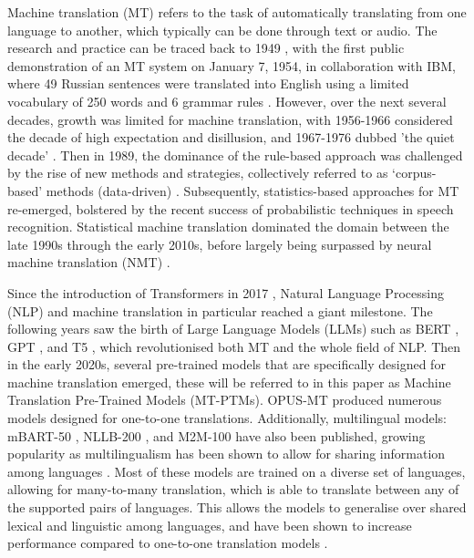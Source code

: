 \documentclass[a4paper, 11pt]{article}
\begin{document}
Machine translation (MT) refers to the task of automatically translating from one language to another, which typically can be done through text or audio. The research and practice can be traced back to 1949 \cite{weaver-1999}, with the first public demonstration of an MT system on January 7, 1954, in collaboration with IBM, where 49 Russian sentences were translated into English using a limited vocabulary of 250 words and 6 grammar rules \cite{hutchins-2006-first-mt}. However, over the next several decades, growth was limited for machine translation, with 1956-1966 considered the decade of high expectation and disillusion, and 1967-1976 dubbed 'the quiet decade' \cite{hutchins-2001-mt-50-years}. Then in 1989, the dominance of the rule-based approach was challenged by the rise of new methods and strategies, collectively referred to as ‘corpus-based’ methods (data-driven) \cite{hutchins-1994-research-methods-mt,hutchins-1998-development-mt}. Subsequently, statistics-based approaches for MT re-emerged, bolstered by the recent success of probabilistic techniques in speech recognition. Statistical machine translation \cite{lopez-2008-smt} dominated the domain between the late 1990s through the early 2010s, before largely being surpassed by neural machine translation (NMT) \cite{cho-2014-properties,sutskever-2014-seq2seq}.

Since the introduction of Transformers in 2017 \cite{vaswani-2017-attention}, Natural Language Processing (NLP) and machine translation in particular reached a giant milestone. The following years saw the birth of Large Language Models (LLMs) such as BERT \cite{devlin-2019-bert}, GPT \cite{openai-2024-gpt4}, and T5 \cite{raffel-2023-t5}, which revolutionised both MT and the whole field of NLP. Then in the early 2020s, several pre-trained models that are specifically designed for machine translation emerged, these will be referred to in this paper as Machine Translation Pre-Trained Models (MT-PTMs). OPUS-MT \cite{tiedemann-2020-opus-mt} produced numerous models designed for one-to-one translations. Additionally, multilingual models: mBART-50 \cite{liu-2020-mbart}, NLLB-200 \cite{nllb200-2020}, and M2M-100 \cite{fan-2020-m2m100} have also been published, growing popularity as multilingualism has been shown to allow for sharing information among languages \cite{garcia-2020-multilingual}. Most of these models are trained on a diverse set of languages, allowing for many-to-many translation, which is able to translate between any of the supported pairs of languages. This allows the models to generalise over shared lexical and linguistic among languages, and have been shown to increase performance compared to one-to-one translation models \cite{liu-2020-mbart}.
\end{document}
